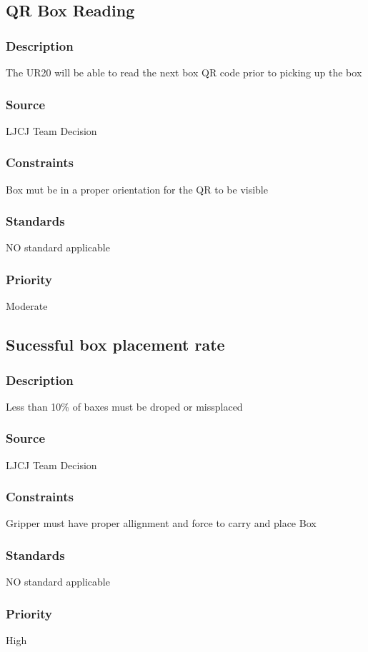 \subsection{QR Box Reading}
\subsubsection{Description}
The UR20 will be able to read the next box QR code prior to picking up the box 
\subsubsection{Source}
LJCJ Team Decision
\subsubsection{Constraints}
Box mut be in a proper orientation for the QR to be visible
\subsubsection{Standards}
NO standard applicable
\subsubsection{Priority}
Moderate

\subsection{Sucessful box placement rate}
\subsubsection{Description}
 Less than 10\% of baxes must be droped or missplaced
\subsubsection{Source}
LJCJ Team Decision
\subsubsection{Constraints}
Gripper must have proper allignment and force to carry and place Box
\subsubsection{Standards}
NO standard applicable
\subsubsection{Priority}
High
